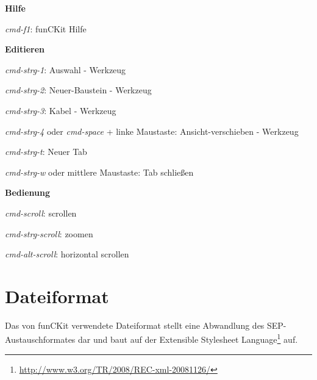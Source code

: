 \documentclass[12pt,a4paper]{scrartcl}
\newcommand{\projectName}{funCKit\xspace} %
\newcommand{\fckNewBrickTool}{Neuer-Baustein - Werkzeug\xspace}
\newcommand{\fckWireTool}{Kabel - Werkzeug\xspace}
\newcommand{\fckSelectTool}{Auswahl - Werkzeug\xspace}
\newcommand{\fckMoveViewportTool}{Ansicht-verschieben - Werkzeug\xspace}
\newcommand{\fckSEPFormatGenitive}{SEP-Austauschformates\xspace}
\begin{document}
\begin{enum}
	\item \textbf{Hilfe}
		\begin{enum}
			\item \textit{\gls{cmd-f1}}: \projectName Hilfe
		\end{enum}
\end{enum}
\begin{enum}
	\item \textbf{Editieren}
		\begin{enum}
			\item \textit{\gls{cmd-strg-1}}: \fckSelectTool
			\item \textit{\gls{cmd-strg-2}}: \fckNewBrickTool
			\item \textit{\gls{cmd-strg-3}}: \fckWireTool
			\item \textit{\gls{cmd-strg-4}} oder \textit{\gls{cmd-space}} + linke Maustaste: \fckMoveViewportTool
			\item \textit{\gls{cmd-strg-t}}: Neuer Tab
			\item \textit{\gls{cmd-strg-w}} oder mittlere Maustaste: Tab schließen
		\end{enum}
\end{enum}
\begin{enum}
	\item \textbf{Bedienung}
		\begin{enum}
			\item \textit{\gls{cmd-scroll}}: scrollen
			\item \textit{\gls{cmd-strg-scroll}}: zoomen
			\item \textit{\gls{cmd-alt-scroll}}: horizontal scrollen
		\end{enum}
\end{enum}

%
%
\newpage
\appendix
\section{Dateiformat}
Das von \projectName verwendete Dateiformat stellt eine Abwandlung des \fckSEPFormatGenitive dar und baut auf der Extensible Stylesheet Language\footnote{\url{http://www.w3.org/TR/2008/REC-xml-20081126/}} auf.
\end{document}
